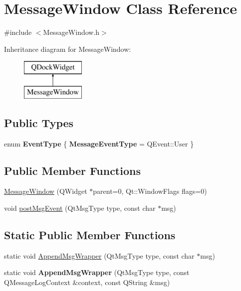 \hypertarget{class_message_window}{}\section{Message\+Window Class Reference}
\label{class_message_window}


{\ttfamily \#include $<$Message\+Window.\+h$>$}

Inheritance diagram for Message\+Window\+:\begin{figure}[H]
\begin{center}
\leavevmode
\includegraphics[height=2.000000cm]{class_message_window}
\end{center}
\end{figure}
\subsection*{Public Types}
\begin{DoxyCompactItemize}
\item 
\mbox{\label{class_message_window_a2628ea8d12e8b2563c32f05dc7fff6fa}} 
enum {\bfseries Event\+Type} \{ {\bfseries Message\+Event\+Type} = Q\+Event\+::User
 \}
\end{DoxyCompactItemize}
\subsection*{Public Member Functions}
\begin{DoxyCompactItemize}
\item 
\mbox{\hyperlink{class_message_window_af9a36b8e14a787044984e1caa1131e2e}{Message\+Window}} (Q\+Widget $\ast$parent=0, Qt\+::\+Window\+Flags flags=0)
\item 
void \mbox{\hyperlink{class_message_window_aaa2d5aa4658897bb5a2e04ba9e318874}{post\+Msg\+Event}} (Qt\+Msg\+Type type, const char $\ast$msg)
\end{DoxyCompactItemize}
\subsection*{Static Public Member Functions}
\begin{DoxyCompactItemize}
\item 
static void \mbox{\hyperlink{class_message_window_a27a0d63a6ac15a65011b5b0c796a720c}{Append\+Msg\+Wrapper}} (Qt\+Msg\+Type type, const char $\ast$msg)
\item 
\mbox{\label{class_message_window_a671f013fdb8e4ca003b3002d82d9ecdd}} 
static void {\bfseries Append\+Msg\+Wrapper} (Qt\+Msg\+Type type, const Q\+Message\+Log\+Context \&context, const Q\+String \&msg)
\end{DoxyCompactItemize}
